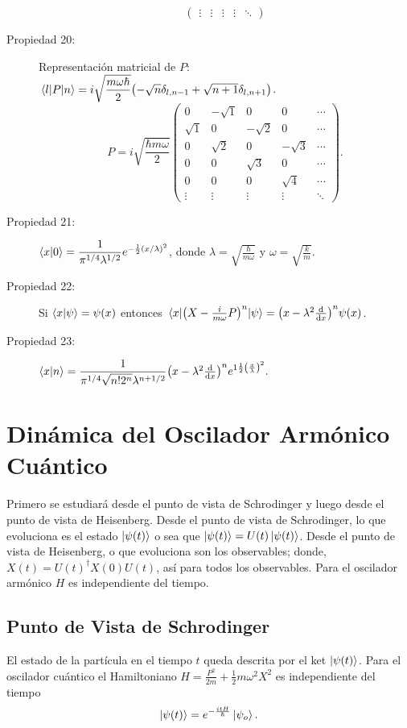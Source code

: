 \begin{description}
$$\begin{pmatrix}
\vdots & \vdots & \vdots & \vdots & \ddots
\end{pmatrix} $$
	\item[Propiedad 20: ] Representación matricial de $P$: $\mel{l}{P}{n} = i\sqrt{\dfrac{m\omega \hbar}{2}} \qty(-\sqrt{n} \delta _{l,n-1} + \sqrt{n+1} \delta _{l,n+1})$.
		$$ P = i \sqrt{\frac{\hbar m \omega}{2}}
\begin{pmatrix}
0 & -\sqrt{1} & 0 & 0 & \cdots \\
\sqrt{1} & 0 & -\sqrt{2} & 0 & \cdots \\
0 & \sqrt{2} & 0 & -\sqrt{3} & \cdots \\
0 & 0 & \sqrt{3} & 0 & \cdots \\
0 & 0 & 0 & \sqrt{4} & \cdots \\
\vdots & \vdots & \vdots & \vdots & \ddots
\end{pmatrix}. $$
	\item[Propiedad 21: ] $\braket{x}{0} = \dfrac{1}{\pi ^{1/4} \lambda ^{1/2}} e^{-\frac{1}{2} \qty(x/\lambda)^2}$, donde $\lambda = \sqrt{\frac{\hbar}{m\omega}}$ y $\omega = \sqrt{\frac{k}{m}}$.
	\item[Propiedad 22: ] Si $\braket{x}{\psi} = \psi (x)$ entonces $\mel{x}{\qty(X - \frac{i}{m\omega} P)^n}{\psi} = \qty(x - \lambda ^2 \dv{x})^n \psi (x)$.
	\item[Propiedad 23: ] $\braket{x}{n} = \dfrac{1}{\pi ^{1/4} \sqrt{n! 2^n} \lambda ^{n + 1/2}} \qty(x - \lambda ^2 \dv{x})^n e^{1\frac{1}{2} \qty(\frac{x}{\lambda})^2}. $
\end{description}


\section{Dinámica del Oscilador Armónico Cuántico}
Primero se estudiará desde el punto de vista de Schrodinger y luego desde el punto de vista de Heisenberg. Desde el punto de vista de Schrodinger, lo que evoluciona es el estado $\ket{\psi (t)}$ o sea que $\ket{\psi (t)} = U(t) \ket{\psi (t)}$. Desde el punto de vista de Heisenberg, o que evoluciona son los observables; donde, $X(t) = U(t) ^\dagger X(0) U(t)$, así para todos los observables. Para el oscilador armónico $H$ es independiente del tiempo.

\subsection{Punto de Vista de Schrodinger}
El estado de la partícula en el tiempo $t$ queda descrita por el ket $\ket{\psi (t)}$. Para el oscilador cuántico el Hamiltoniano $H = \frac{P^2}{2m} + \frac{1}{2} m\omega ^2 X^2$ es independiente del tiempo
	$$ \ket{\psi (t)} = e^{-\frac{itH}{\hbar}} \ket{\psi _o}. $$
	
